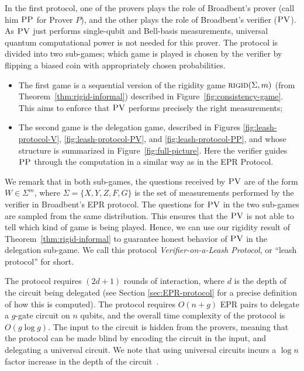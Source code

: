 \documentclass[11pt]{article}
\newcommand{\rigid}{\textsc{rigid}}
\newcommand{\pv}{\textsc{PV}}
\newcommand{\pp}{\textsc{PP}}
\begin{document}
In the first protocol, one of the provers plays the role of Broadbent's prover
(call him $\pp$ for Prover $P$), and the other plays the role of Broadbent's
verifier ($\pv$). As $\pv$  just performs
single-qubit and Bell-basis measurements, universal quantum
computational power is not needed for this prover.
The protocol is divided into two sub-games; which game is played is chosen by the verifier by flipping a biased coin with appropriately chosen probabilities.
\begin{itemize}[nolistsep]
\item The first game is a sequential version of the rigidity game $\rigid(\Sigma,m)$ (from Theorem~\ref{thm:rigid-informal}) described in Figure~\ref{fig:consistency-game}. This aims to enforce that $\pv$ performs precisely the right measurements;
\item The second game is the delegation game, described in Figures \ref{fig:leash-protocol-V}, \ref{fig:leash-protocol-PV}, and \ref{fig:leash-protocol-PP}, and whose structure is summarized in Figure~\ref{fig:full-picture}. Here the verifier guides $\pp$ through the computation in a similar way as in the EPR Protocol.
\end{itemize}

We remark that in both sub-games, the questions received by $\pv$ are of the form $W\in \Sigma^m$, where $\Sigma = \{X,Y,Z,F,G\}$ is the set of measurements performed by the verifier in Broadbent's EPR protocol. 
The questions for $\pv$ in the two sub-games are sampled from the same distribution. This ensures that the $\pv$ is not able to tell which kind of game is being played. Hence, we can use our rigidity result of Theorem~\ref{thm:rigid-informal} to guarantee honest behavior of $\pv$ in the delegation sub-game. 
We call this protocol \emph{Verifier-on-a-Leash
Protocol}, or ``leash protocol'' for short.

The protocol requires $(2d+1)$ rounds of interaction, where $d$ is the depth of the circuit being delegated (see Section \ref{sec:EPR-protocol} for a precise definition of how this is computed). %
The protocol requires $O(n+g)$ EPR pairs to delegate a $g$-gate circuit on $n$ qubits, and the overall time complexity of the protocol is $O(g\log g)$.
The input to the circuit is hidden from the provers, meaning that the protocol can be made blind by encoding the circuit in the input, and delegating a universal circuit. We note that using universal circuits incurs a $\log{n}$ factor increase in the depth of the circuit~\cite{BeraFGH10}.
\end{document}

